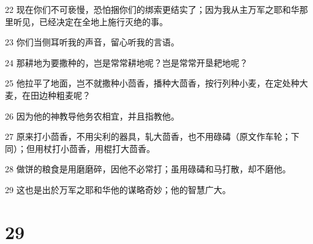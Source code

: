 \par 22 现在你们不可亵慢，恐怕捆你们的绑索更结实了；因为我从主万军之耶和华那里听见，已经决定在全地上施行灭绝的事。
\par 23 你们当侧耳听我的声音，留心听我的言语。
\par 24 那耕地为要撒种的，岂是常常耕地呢？岂是常常开垦耙地呢？
\par 25 他拉平了地面，岂不就撒种小茴香，播种大茴香，按行列种小麦，在定处种大麦，在田边种粗麦呢？
\par 26 因为他的神教导他务农相宜，并且指教他。
\par 27 原来打小茴香，不用尖利的器具，轧大茴香，也不用碌碡（原文作车轮；下同）；但用杖打小茴香，用棍打大茴香。
\par 28 做饼的粮食是用磨磨碎，因他不必常打；虽用碌碡和马打散，却不磨他。
\par 29 这也是出於万军之耶和华他的谋略奇妙；他的智慧广大。

\chapter{29}

